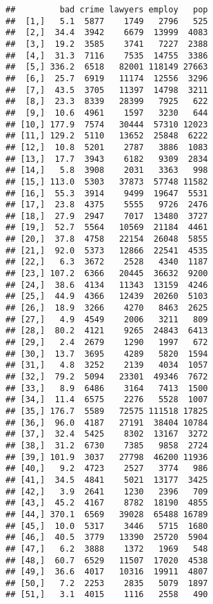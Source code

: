\documentclass[
  11pt,
]{article}
\begin{document}
\begin{verbatim}
##         bad crime lawyers employ   pop
##  [1,]   5.1  5877    1749   2796   525
##  [2,]  34.4  3942    6679  13999  4083
##  [3,]  19.2  3585    3741   7227  2388
##  [4,]  31.3  7116    7535  14755  3386
##  [5,] 336.2  6518   82001 118149 27663
##  [6,]  25.7  6919   11174  12556  3296
##  [7,]  43.5  3705   11397  14798  3211
##  [8,]  23.3  8339   28399   7925   622
##  [9,]  10.6  4961    1597   3230   644
## [10,] 177.9  7574   30444  57310 12023
## [11,] 129.2  5110   13652  25848  6222
## [12,]  10.8  5201    2787   3886  1083
## [13,]  17.7  3943    6182   9309  2834
## [14,]   5.8  3908    2031   3363   998
## [15,] 113.0  5303   37873  57748 11582
## [16,]  55.3  3914    9499  19647  5531
## [17,]  23.8  4375    5555   9726  2476
## [18,]  27.9  2947    7017  13480  3727
## [19,]  52.7  5564   10569  21184  4461
## [20,]  37.8  4758   22154  26048  5855
## [21,]  92.0  5373   12866  22541  4535
## [22,]   6.3  3672    2528   4340  1187
## [23,] 107.2  6366   20445  36632  9200
## [24,]  38.6  4134   11343  13159  4246
## [25,]  44.9  4366   12439  20260  5103
## [26,]  18.9  3266    4270   8463  2625
## [27,]   4.9  4549    2006   3211   809
## [28,]  80.2  4121    9265  24843  6413
## [29,]   2.4  2679    1290   1997   672
## [30,]  13.7  3695    4289   5820  1594
## [31,]   4.8  3252    2139   4034  1057
## [32,]  79.2  5094   23301  49346  7672
## [33,]   8.9  6486    3164   7413  1500
## [34,]  11.4  6575    2276   5528  1007
## [35,] 176.7  5589   72575 111518 17825
## [36,]  96.0  4187   27191  38404 10784
## [37,]  32.4  5425    8302  13167  3272
## [38,]  31.2  6730    7385   9858  2724
## [39,] 101.9  3037   27798  46200 11936
## [40,]   9.2  4723    2527   3774   986
## [41,]  34.5  4841    5021  13177  3425
## [42,]   3.9  2641    1230   2396   709
## [43,]  45.2  4167    8782  18190  4855
## [44,] 370.1  6569   39028  65488 16789
## [45,]  10.0  5317    3446   5715  1680
## [46,]  40.5  3779   13390  25720  5904
## [47,]   6.2  3888    1372   1969   548
## [48,]  60.7  6529   11507  17020  4538
## [49,]  36.6  4017   10316  19911  4807
## [50,]   7.2  2253    2835   5079  1897
## [51,]   3.1  4015    1116   2558   490
\end{verbatim}
\end{document}
